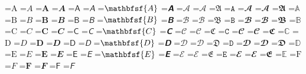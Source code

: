 \documentclass{article}
\begin{document}
=\hbox{$\mathrm{A}$}
=\hbox{$\mathit{A}$}
=\hbox{$\mathbf{A}$}
=\hbox{$\mathbfit{A}$}
=\hbox{$\mathsf{A}$}
=\hbox{$\mathsfit{A}$}
=\hbox{$\mathbfsf{A}$}
=\hbox{$\mathbfsfit{A}$}
=\hbox{$\mathcal{A}$}
=\hbox{$\mathscr{A}$}
=\hbox{$\mathfrak{A}$}
=\hbox{$\mathtt{A}$}
=\hbox{$\mathbfcal{A}$}
=\hbox{$\mathbfscr{A}$}
=\hbox{$\mathbffrak{A}$}
=\hbox{$\mathbb{A}$}
=\hbox{$\mathrm{B}$}
=\hbox{$\mathit{B}$}
=\hbox{$\mathbf{B}$}
=\hbox{$\mathbfit{B}$}
=\hbox{$\mathsf{B}$}
=\hbox{$\mathsfit{B}$}
=\hbox{$\mathbfsf{B}$}
=\hbox{$\mathbfsfit{B}$}
=\hbox{$\mathcal{B}$}
=\hbox{$\mathscr{B}$}
=\hbox{$\mathfrak{B}$}
=\hbox{$\mathtt{B}$}
=\hbox{$\mathbfcal{B}$}
=\hbox{$\mathbfscr{B}$}
=\hbox{$\mathbffrak{B}$}
=\hbox{$\mathbb{B}$}
=\hbox{$\mathrm{C}$}
=\hbox{$\mathit{C}$}
=\hbox{$\mathbf{C}$}
=\hbox{$\mathbfit{C}$}
=\hbox{$\mathsf{C}$}
=\hbox{$\mathsfit{C}$}
=\hbox{$\mathbfsf{C}$}
=\hbox{$\mathbfsfit{C}$}
=\hbox{$\mathcal{C}$}
=\hbox{$\mathscr{C}$}
=\hbox{$\mathfrak{C}$}
=\hbox{$\mathtt{C}$}
=\hbox{$\mathbfcal{C}$}
=\hbox{$\mathbfscr{C}$}
=\hbox{$\mathbffrak{C}$}
=\hbox{$\mathbb{C}$}
=\hbox{$\mathrm{D}$}
=\hbox{$\mathit{D}$}
=\hbox{$\mathbf{D}$}
=\hbox{$\mathbfit{D}$}
=\hbox{$\mathsf{D}$}
=\hbox{$\mathsfit{D}$}
=\hbox{$\mathbfsf{D}$}
=\hbox{$\mathbfsfit{D}$}
=\hbox{$\mathcal{D}$}
=\hbox{$\mathscr{D}$}
=\hbox{$\mathfrak{D}$}
=\hbox{$\mathtt{D}$}
=\hbox{$\mathbfcal{D}$}
=\hbox{$\mathbfscr{D}$}
=\hbox{$\mathbffrak{D}$}
=\hbox{$\mathbb{D}$}
=\hbox{$\mathrm{E}$}
=\hbox{$\mathit{E}$}
=\hbox{$\mathbf{E}$}
=\hbox{$\mathbfit{E}$}
=\hbox{$\mathsf{E}$}
=\hbox{$\mathsfit{E}$}
=\hbox{$\mathbfsf{E}$}
=\hbox{$\mathbfsfit{E}$}
=\hbox{$\mathcal{E}$}
=\hbox{$\mathscr{E}$}
=\hbox{$\mathfrak{E}$}
=\hbox{$\mathtt{E}$}
=\hbox{$\mathbfcal{E}$}
=\hbox{$\mathbfscr{E}$}
=\hbox{$\mathbffrak{E}$}
=\hbox{$\mathbb{E}$}
=\hbox{$\mathrm{F}$}
=\hbox{$\mathit{F}$}
=\hbox{$\mathbf{F}$}
=\hbox{$\mathbfit{F}$}
=\hbox{$\mathsf{F}$}
=\hbox{$\mathsfit{F}$}
\end{document}
